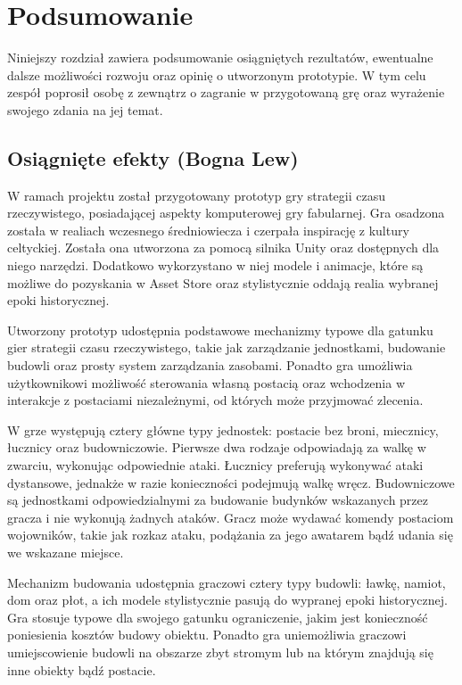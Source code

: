 \chapter{Podsumowanie}\label{chap:summary}
Niniejszy rozdział zawiera podsumowanie osiągniętych rezultatów, ewentualne dalsze możliwości rozwoju oraz opinię o
utworzonym prototypie. W tym celu zespół poprosił osobę z zewnątrz o zagranie w przygotowaną grę oraz wyrażenie swojego
zdania na jej temat.

\section{Osiągnięte efekty (Bogna Lew)}\label{s:efekty}
W ramach projektu został przygotowany prototyp gry strategii czasu rzeczywistego, posiadającej aspekty komputerowej gry
fabularnej. Gra osadzona została w realiach wczesnego średniowiecza i czerpała inspirację z kultury celtyckiej. Została ona
utworzona za pomocą silnika Unity oraz dostępnych dla niego narzędzi. Dodatkowo wykorzystano w niej modele i animacje,
które są możliwe do pozyskania w Asset Store oraz stylistycznie oddają realia wybranej epoki historycznej.

Utworzony prototyp udostępnia podstawowe mechanizmy typowe dla gatunku gier strategii czasu rzeczywistego, takie jak
zarządzanie jednostkami, budowanie budowli oraz prosty system zarządzania zasobami. Ponadto gra umożliwia użytkownikowi
możliwość sterowania własną postacią oraz wchodzenia w interakcje z postaciami niezależnymi, od których może przyjmować
zlecenia.

W grze występują cztery główne typy jednostek: postacie bez broni, miecznicy, łucznicy oraz budowniczowie. Pierwsze dwa
rodzaje odpowiadają za walkę w zwarciu, wykonując odpowiednie ataki. Łucznicy preferują wykonywać ataki dystansowe,
jednakże w razie konieczności podejmują walkę wręcz. Budowniczowe są jednostkami odpowiedzialnymi za budowanie budynków
wskazanych przez gracza i nie wykonują żadnych ataków. Gracz może wydawać komendy postaciom wojowników, takie jak rozkaz
ataku, podążania za jego awatarem bądź udania się we wskazane miejsce.

Mechanizm budowania udostępnia graczowi cztery typy budowli: ławkę, namiot, dom oraz płot, a ich modele stylistycznie
pasują do wypranej epoki historycznej. Gra stosuje typowe dla swojego gatunku ograniczenie, jakim jest konieczność
poniesienia kosztów budowy obiektu. Ponadto gra uniemożliwia graczowi umiejscowienie budowli na obszarze zbyt stromym
lub na którym znajdują się inne obiekty bądź postacie.

